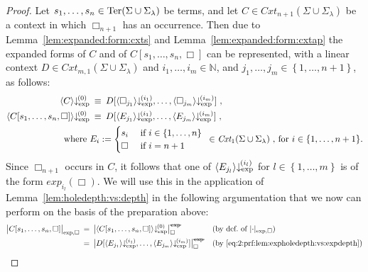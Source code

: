 \documentclass[
submission
]{dmtcs-episciences-tampered}
\newcommand{\fap}[2]{#1({#2})}
\newcommand{\iap}[2]{#1 _{#2}}
\newcommand{\indap}[2]{#1 _{#2}}
\newcommand{\subap}[2]{#1 _{#2}}
\newcommand{\bap}{\subap}
\newcommand{\bpap}[3]{#1 _{#2}^{#3}}
\newcommand{\nf}{\normalfont}
\newcommand{\sdefdby}{{:=}}
\newcommand{\defdby}{\mathrel{\sdefdby}}
\newcommand{\punc}[1]{\ensuremath{\hspace*{3pt}{#1}}}
\newcommand{\setexp}[1]{\left\{{#1}\right\}}
\newcommand{\nat}{\mathbb{N}}
\newcommand{\ater}{s}
\newcommand{\ateri}{\indap{\ater}}
\newcommand{\asig}{\Sigma}
\newcommand{\asiglambda}{\indap{\asig}{\lambda}}
\newcommand{\stermsover}{\text{\nf Ter}}
\newcommand{\termsover}{\fap{\stermsover}}
\newcommand{\scontextsover}{\textit{Cxt}}
\newcommand{\scontextsnover}{\bap{\scontextsover}}
\newcommand{\contextsnover}[1]{\fap{\scontextsnover{#1}}}
\newcommand{\cxtap}[2]{{#1}[#2]}
\newcommand{\acxt}{C}
\newcommand{\bcxt}{D}
\newcommand{\ccxt}{E}
\newcommand{\acxtap}{\cxtap{\acxt}}
\newcommand{\bcxtap}{\cxtap{\bcxt}}
\newcommand{\ccxti}{\bap{\ccxt}}
\newcommand{\hole}{\Box}
\newcommand{\holei}{\iap{\hole}}
\newcommand{\expholedepth}[1]{\lvert{#1}\rvert_{\scriptexp,\hole}}
\newcommand{\expholedepthbig}[1]{\bigl\lvert{#1}\bigr\rvert_{\scriptexp,\hole}}
\newcommand{\holedepthnotexpbig}[1]{\big\lvert{#1}\big\rvert_{\hole}^{\scriptnotexp}}
\newcommand{\scriptnotexp}{\text{\sout{\nf\hspace*{1pt}exp\hspace*{1pt}}}}
\newcommand{\ssyntequal}{{\equiv}}
\newcommand{\syntequal}{\mathrel{\ssyntequal}}
\newcommand{\scriptexp}{\text{\nf exp}}
\newcommand{\sexpand}{\textit{exp}}
\newcommand{\sexpandi}{\indap{\sexpand}}
\newcommand{\expandi}[1]{\fap{\sexpandi{#1}}}
\newcommand{\sexprednfi}[1]{{\bpap{\downarrow}{\scriptexp}{\hspace*{-1pt}(#1)}}}
\newcommand{\exprednfi}[2]{{\langle#2\rangle}\sexprednfi{#1}}
\theoremstyle{plain}
\theoremstyle{definition}
\begin{document}
\begin{proof}
  Let $\ateri{1},\ldots,\ateri{n}\in\termsover{\asig\cup\asiglambda}$ be terms,
  and let $\acxt\in\contextsnover{n+1}{\asig\cup\asiglambda}$ be a context
  in which $\holei{n+1}$ has an occurrence.
  Then due to Lemma~\ref{lem:expanded:form:cxts} and Lemma~\ref{lem:expanded:form:cxtap} 
  the expanded forms of $\acxt$ and of $\acxtap{\ateri{1},\ldots,\ateri{n},\hole}$ 
  can be represented, with a linear context $\bcxt\in\contextsnover{m,1}{\asig\cup\asiglambda}$ 
  and $i_1,\ldots,i_m\in\nat$, and $j_1,\ldots,j_m\in\setexp{1,\ldots,n+1}$, 
  as follows:
  \begin{align}
    \exprednfi{0}{ \acxt }
      & \:\syntequal\:
    \bcxtap{ \exprednfi{i_1}{\holei{j_1}}, \ldots, \exprednfi{i_m}{\holei{j_m} } } \punc{,}
      \label{eq:1:prf:lem:expholedepth:vs:expdepth}
    \\
    \exprednfi{0}{ \acxtap{\ateri{1},\ldots,\ateri{n},\hole} }
      & \:\syntequal\:
    \bcxtap{ \exprednfi{i_1}{\ccxti{j_1}}, \ldots, \exprednfi{i_m}{\ccxti{j_m} } } \punc{,}
      \label{eq:2:prf:lem:expholedepth:vs:expdepth}
    \\
    \text{where }
      & 
      \ccxti{i} \defdby \begin{cases}
                          \ateri{i} & \text{ if $i\in\setexp{1,\ldots,n}$} 
                          \\
                          \hole    & \text{ if $i = n+1$} 
                        \end{cases}
                        \hspace*{1ex} \in\contextsnover{1}{\asig\cup\asiglambda}\punc{,}\text{ for $i\in\setexp{1,\ldots,n+1}$.}
      \notag
  \end{align}
  Since $\holei{n+1}$ occurs in $\acxt$, it follows that one of $\exprednfi{i_l}{\ccxti{j_l}}$ for $l\in\setexp{1,\ldots,m}$
  is of the form $\expandi{i_l}{\hole}$. We will use this in the application of Lemma~\ref{lem:holedepth:vs:depth}
  in the following argumentation that we now can perform on the basis of the preparation above: 
  \begin{align*}
    \expholedepthbig{ \acxtap{\ateri{1},\ldots,\ateri{n},\hole}}
      \: & = \:
    \holedepthnotexpbig{ \exprednfi{0}{ \acxtap{\ateri{1},\ldots,\ateri{n},\hole} } }
      & & \text{(by def.\ of $\expholedepth{\cdot}$)}
    \\
      & = \:
    \holedepthnotexpbig{ \bcxtap{ \exprednfi{i_1}{\ccxti{j_1}}, \ldots, \exprednfi{i_m}{\ccxti{j_m} } } }      
      & & \text{(by \eqref{eq:2:prf:lem:expholedepth:vs:expdepth})} 

\end{align*}
\end{proof}
\end{document}
